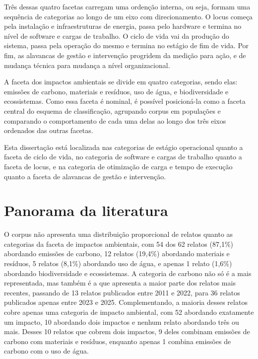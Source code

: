 Três dessas quatro facetas carregam uma ordenção interna, ou seja, formam uma sequência de categorias
ao longo de um eixo com direcionamento. O locus começa pela instalação e infraestruturas de energia,
passa pelo hardware e termina no nível de software e cargas de trabalho. O ciclo de vida vai da produção 
do sistema, passa pela operação do mesmo e termina no estágio de fim de vida. Por fim, as alavancas de gestão
e intervenção progridem da medição para ação, e de mudança técnica para mudança a nível organizacional.

A faceta dos impactos ambientais se divide em quatro categorias, sendo elas: emissões de carbono,
materiais e resíduos, uso de água, e biodiversidade e ecossistemas. Como essa faceta é nominal,
é possível posicioná-la como a faceta central do esquema de classificação, agrupando corpus em populações
e comparando o comportamento de cada uma delas ao longo dos três eixos ordenados das outras facetas.

Esta dissertação está localizada nas categorias de estágio operacional quanto a faceta de ciclo de vida,
no categoria de software e cargas de trabalho quanto a faceta de locus, e na categoria de otimização 
de carga e tempo de execução quanto a faceta de alavancas de gestão e intervenção.

\section{Panorama da literatura}

O corpus não apresenta uma distribuição proporcional de relatos quanto as categorias da faceta de
impactos ambientais, com 54 dos 62 relatos (87,1\%) abordando emissões de carbono,
12 relatos (19,4\%) abordando materiais e resíduos, 5 relatos (8,1\%) abordando uso de água, e
apenas 1 relato (1,6\%) abordando biodiversidade e ecossistemas. A categoria de carbono não só é a mais representada, mas também é a que apresenta a maior parte dos relatos mais recentes, 
passando de 13 relatos publicados entre 2011 e 2022, para 36 relatos publicados apenas entre 2023 e 2025.
Complementando, a maioria desses relatos cobre apenas uma categoria de impacto ambiental, com 52 abordando exatamente um impacto, 10 abordando
dois impactos e nenhum relato abordando três ou mais. Desses 10 relatos que cobrem dois impactos,
9 deles combinam emissões de carbono com materiais e resíduos, enquanto apenas 1 combina emissões
de carbono com o uso de água. 

